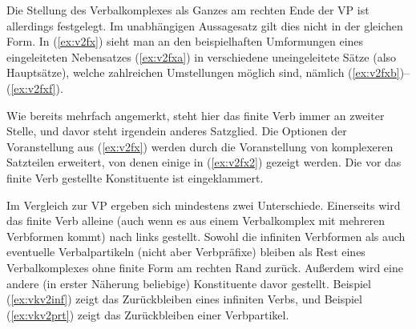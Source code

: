 Die Stellung des Verbalkomplexes als Ganzes am rechten Ende der VP ist allerdings festgelegt.
Im unabhängigen Aussagesatz gilt dies nicht in der gleichen Form.
In (\ref{ex:v2fx}) sieht man an den beispielhaften Umformungen eines eingeleiteten Nebensatzes (\ref{ex:v2fxa}) in verschiedene uneingeleitete Sätze (also Hauptsätze), welche zahlreichen Umstellungen möglich sind, nämlich (\ref{ex:v2fxb})--(\ref{ex:v2fxf}).

\begin{exe}
  \ex\label{ex:v2fx}
  \begin{xlist}
  \end{xlist}
\end{exe}

Wie bereits mehrfach angemerkt, steht hier das finite Verb immer an zweiter Stelle, und davor steht irgendein anderes Satzglied.
Die Optionen der Voranstellung aus (\ref{ex:v2fx}) werden durch die Voranstellung von komplexeren Satzteilen erweitert, von denen einige in (\ref{ex:v2fx2}) gezeigt werden.
Die vor das finite Verb gestellte Konstituente ist eingeklammert.

\begin{exe}
  \ex\label{ex:v2fx2}
  \begin{xlist}
  \end{xlist}
\end{exe}

Im Vergleich zur VP ergeben sich mindestens zwei Unterschiede.
Einerseits wird das finite Verb alleine (auch wenn es aus einem Verbalkomplex mit mehreren Verbformen kommt) nach links gestellt.
Sowohl die infiniten Verbformen als auch eventuelle Verbalpartikeln (nicht aber Verbpräfixe) bleiben als Rest eines Verbalkomplexes ohne finite Form am rechten Rand zurück.
Außerdem wird eine andere (in erster Näherung beliebige) Konstituente davor gestellt.
Beispiel (\ref{ex:vkv2inf}) zeigt das Zurückbleiben eines infiniten Verbs, und Beispiel (\ref{ex:vkv2prt}) zeigt das Zurückbleiben einer Verbpartikel.

